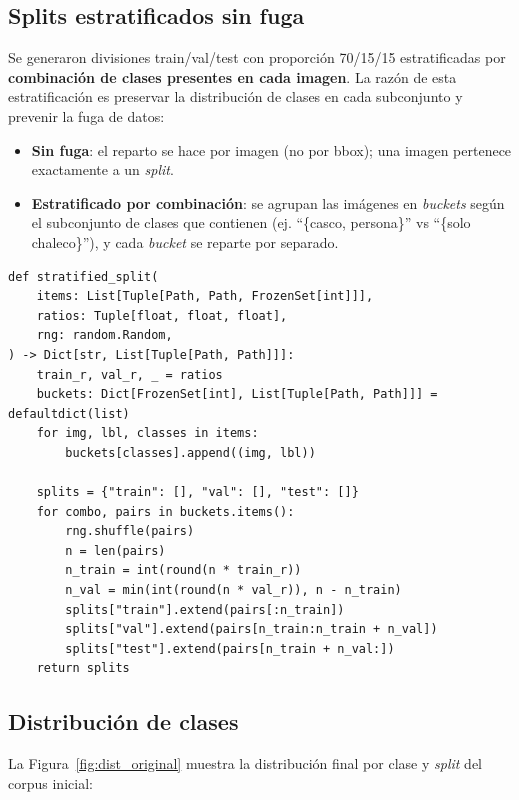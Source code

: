 \documentclass[11pt,a4paper]{article}
\begin{document}
\subsection{Splits estratificados sin fuga}

Se generaron divisiones train/val/test con proporción 70/15/15
estratificadas por \textbf{combinación de clases presentes en cada
imagen}. La razón de esta estratificación es preservar la distribución
de clases en cada subconjunto y prevenir la fuga de datos:

\begin{itemize}[leftmargin=*]
    \item \textbf{Sin fuga}: el reparto se hace por imagen (no por
    bbox); una imagen pertenece exactamente a un \textit{split}.
    \item \textbf{Estratificado por combinación}: se agrupan las
    imágenes en \emph{buckets} según el subconjunto de clases que
    contienen (ej. ``\{casco, persona\}'' vs ``\{solo chaleco\}''), y
    cada \textit{bucket} se reparte por separado.
\end{itemize}

\begin{lstlisting}[caption={Núcleo del algoritmo de \textit{stratified split} en
\texttt{src/data/make\_splits.py}.}]
def stratified_split(
    items: List[Tuple[Path, Path, FrozenSet[int]]],
    ratios: Tuple[float, float, float],
    rng: random.Random,
) -> Dict[str, List[Tuple[Path, Path]]]:
    train_r, val_r, _ = ratios
    buckets: Dict[FrozenSet[int], List[Tuple[Path, Path]]] = defaultdict(list)
    for img, lbl, classes in items:
        buckets[classes].append((img, lbl))

    splits = {"train": [], "val": [], "test": []}
    for combo, pairs in buckets.items():
        rng.shuffle(pairs)
        n = len(pairs)
        n_train = int(round(n * train_r))
        n_val = min(int(round(n * val_r)), n - n_train)
        splits["train"].extend(pairs[:n_train])
        splits["val"].extend(pairs[n_train:n_train + n_val])
        splits["test"].extend(pairs[n_train + n_val:])
    return splits
\end{lstlisting}

\subsection{Distribución de clases}

La Figura~\ref{fig:dist_original} muestra la distribución final por
clase y \textit{split} del corpus inicial:
\end{document}
